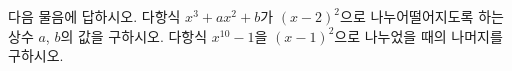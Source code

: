 다음 물음에 답하시오.
 다항식 $x^3+ax^2+b$가 $(x-2)^2$으로 나누어떨어지도록 하는 상수 $a$, $b$의 값을 구하시오.
 다항식 $x^{10}-1$을 $(x-1)^2$으로 나누었을 때의 나머지를 구하시오.
